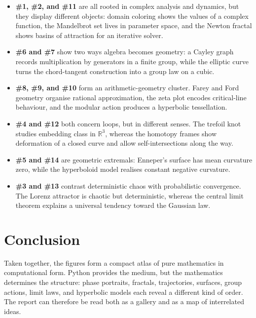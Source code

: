 \documentclass[11pt,a4paper]{article}
\begin{document}
\begin{itemize}[leftmargin=*]
    \item \textbf{\#1, \#2, and \#11} are all rooted in complex analysis and dynamics, but they display different objects: domain coloring shows the values of a complex function, the Mandelbrot set lives in parameter space, and the Newton fractal shows basins of attraction for an iterative solver.

    \item \textbf{\#6 and \#7} show two ways algebra becomes geometry: a Cayley graph records multiplication by generators in a finite group, while the elliptic curve turns the chord-tangent construction into a group law on a cubic.

    \item \textbf{\#8, \#9, and \#10} form an arithmetic-geometry cluster. Farey and Ford geometry organise rational approximation, the zeta plot encodes critical-line behaviour, and the modular action produces a hyperbolic tessellation.

    \item \textbf{\#4 and \#12} both concern loops, but in different senses. The trefoil knot studies embedding class in \(\mathbb{R}^3\), whereas the homotopy frames show deformation of a closed curve and allow self-intersections along the way.

    \item \textbf{\#5 and \#14} are geometric extremals: Enneper's surface has mean curvature zero, while the hyperboloid model realises constant negative curvature.

    \item \textbf{\#3 and \#13} contrast deterministic chaos with probabilistic convergence. The Lorenz attractor is chaotic but deterministic, whereas the central limit theorem explains a universal tendency toward the Gaussian law.
\end{itemize}

\clearpage
\section{Conclusion}

Taken together, the figures form a compact atlas of pure mathematics in computational form. Python provides the medium, but the mathematics determines the structure: phase portraits, fractals, trajectories, surfaces, group actions, limit laws, and hyperbolic models each reveal a different kind of order. The report can therefore be read both as a gallery and as a map of interrelated ideas.
\end{document}
